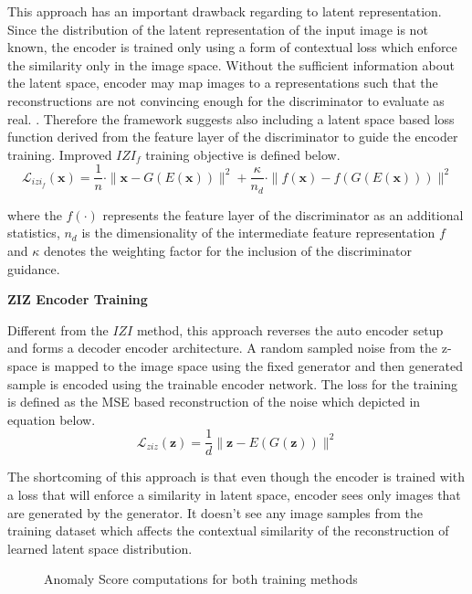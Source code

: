 This approach has an important drawback regarding to latent representation. Since the distribution
of the latent representation of the input image is not known, the encoder is trained only using a
form of contextual loss which enforce the similarity only in the image space. Without the
sufficient information about the latent space, encoder may map images to a representations such
that the reconstructions are not convincing enough for the discriminator to evaluate as real.
\cite{pub.1111824956}. Therefore the framework suggests also including a latent space based loss
function derived from the feature layer of the discriminator to guide the encoder training. Improved
$IZI_{f}$ training objective is defined below.
\begin{equation}
	\mathcal{L}_{i z i_{f}}(\mathbf{x})=\frac{1}{n} \cdot\|\mathbf{x}-G(E(\mathbf{x}))\|^{2}+\frac{\kappa}{n_{d}} \cdot\|f(\mathbf{x})-f(G(E(\mathbf{x})))\|^{2}
\end{equation}

where the $f(\cdot)$ represents the feature layer of the discriminator as an additional statistics, $n_{d}$ is
the dimensionality of the intermediate feature representation $f$ and $\kappa$ denotes the weighting
factor for the inclusion of the discriminator guidance.

\textbf{ZIZ Encoder Training}

Different from the $IZI$ method, this approach reverses the auto encoder setup and forms a decoder
encoder architecture. A random sampled noise from the z-space is mapped to the image space using the
fixed generator and then generated sample is encoded using the trainable encoder network. The loss
for the training is defined as the MSE based reconstruction of the noise which depicted in equation
below. 
\begin{equation}
	\mathcal{L}_{z i z}(\mathbf{z})=\frac{1}{d}\|\mathbf{z}-E(G(\mathbf{z}))\|^{2}
\end{equation}

The shortcoming of this approach is that even though the encoder is trained with a loss that will
enforce a similarity in latent space, encoder sees only images that are generated by the generator.
It doesn't see any image samples from the training dataset which affects the contextual similarity
of the reconstruction of learned latent space distribution. 
\begin{figure}[h!] 
	\hspace*{\fill}%
	\caption{Anomaly Score computations for both training methods \cite{pub.1111824956}}
	\label{fig:fanogan_anomaly_score}
\end{figure}

